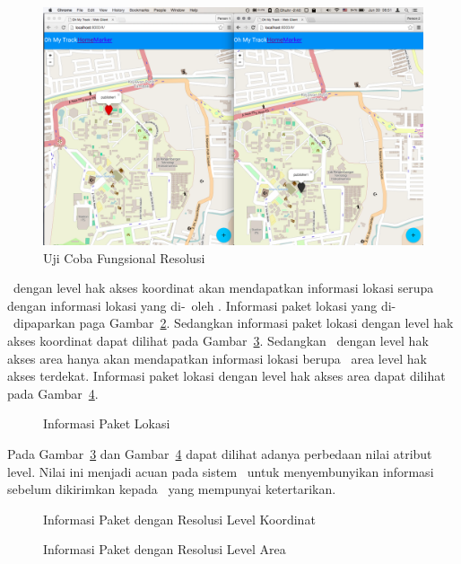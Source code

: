 \noindent
\begin{figure}
  \centering
  \includegraphics[scale=0.25]
	{images/4-fungsional-resolusi.png}
  \caption{Uji Coba Fungsional Resolusi}
\label{fig:fungsional_resolusi}
\end{figure}

\Subscriber~dengan level hak akses koordinat akan mendapatkan informasi lokasi
serupa dengan informasi lokasi yang di-\publish~oleh \publisher. Informasi paket
lokasi yang di-\publish~dipaparkan paga Gambar~\ref{fig:publisher1}. Sedangkan
informasi paket lokasi dengan level hak akses koordinat dapat dilihat pada
Gambar~\ref{fig:subscriber1}. Sedangkan \subscriber~dengan level hak akses area
hanya akan mendapatkan informasi lokasi berupa \centroid~area level hak akses
terdekat. Informasi paket lokasi dengan level hak akses area dapat dilihat pada
Gambar~\ref{fig:subscriber4}.

\begin{figure}
	\centering
	\lstset{basicstyle=\ttfamily,frame=single,language=javascript}
	
	\caption{Informasi Paket Lokasi \Publisher}
\label{fig:publisher1}
\end{figure}

Pada Gambar~\ref{fig:subscriber1} dan Gambar~\ref{fig:subscriber4} dapat dilihat
adanya perbedaan nilai atribut level. Nilai ini menjadi acuan pada sistem
\pubsub~untuk menyembunyikan informasi sebelum dikirimkan kepada
\subscriber~yang mempunyai ketertarikan.

\noindent
\begin{figure}
	\centering
	\lstset{basicstyle=\ttfamily,frame=single,language=javascript}
	
	\caption{Informasi Paket dengan Resolusi Level Koordinat}
\label{fig:subscriber1}
\end{figure}

\noindent
\begin{figure}
	\centering
	\lstset{basicstyle=\ttfamily,frame=single,language=javascript}
	
	\caption{Informasi Paket dengan Resolusi Level Area}
\label{fig:subscriber4}
\end{figure}



